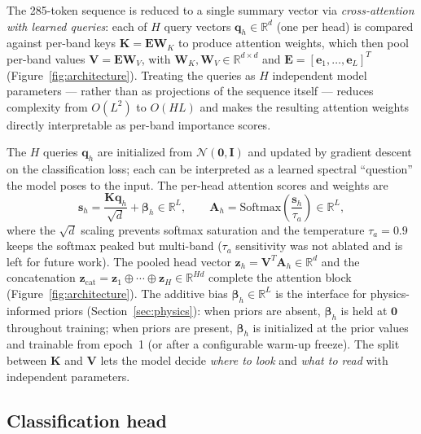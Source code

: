 \documentclass[preprint,12pt]{elsarticle}
\newcommand{\R}{\mathbb{R}}
\begin{document}
The 285-token sequence is reduced to a single summary vector via \emph{cross-attention with learned queries}: each of $H$ query vectors $\mathbf{q}_h \in \R^d$ (one per head) is compared against per-band keys $\mathbf{K} = \mathbf{E}\mathbf{W}_K$ to produce attention weights, which then pool per-band values $\mathbf{V} = \mathbf{E}\mathbf{W}_V$, with $\mathbf{W}_K, \mathbf{W}_V \in \R^{d \times d}$ and $\mathbf{E} = [\mathbf{e}_1,\ldots,\mathbf{e}_L]^T$ (Figure~\ref{fig:architecture}). Treating the queries as $H$ independent model parameters --- rather than as projections of the sequence itself --- reduces complexity from $O(L^2)$ to $O(H L)$ and makes the resulting attention weights directly interpretable as per-band importance scores.

The $H$ queries $\mathbf{q}_h$ are initialized from $\mathcal{N}(\mathbf{0}, \mathbf{I})$ and updated by gradient descent on the classification loss; each can be interpreted as a learned spectral ``question'' the model poses to the input. The per-head attention scores and weights are
\begin{equation}
\mathbf{s}_h = \frac{\mathbf{K}\mathbf{q}_h}{\sqrt{d}} + \bm{\beta}_h \in \R^L, \qquad \mathbf{A}_h = \text{Softmax}\!\left(\frac{\mathbf{s}_h}{\tau_a}\right) \in \R^L,
\label{eq:attn_score}
\end{equation}
where the $\sqrt{d}$ scaling prevents softmax saturation and the temperature $\tau_a = 0.9$ keeps the softmax peaked but multi-band ($\tau_a$ sensitivity was not ablated and is left for future work). The pooled head vector $\mathbf{z}_h = \mathbf{V}^T \mathbf{A}_h \in \R^d$ and the concatenation $\mathbf{z}_{\text{cat}} = \mathbf{z}_1 \oplus \cdots \oplus \mathbf{z}_H \in \R^{Hd}$ complete the attention block (Figure~\ref{fig:architecture}). The additive bias $\bm{\beta}_h \in \R^L$ is the interface for physics-informed priors (Section~\ref{sec:physics}): when priors are absent, $\bm{\beta}_h$ is held at $\mathbf{0}$ throughout training; when priors are present, $\bm{\beta}_h$ is initialized at the prior values and trainable from epoch~1 (or after a configurable warm-up freeze). The split between $\mathbf{K}$ and $\mathbf{V}$ lets the model decide \emph{where to look} and \emph{what to read} with independent parameters.

\subsection{Classification head}
\label{sec:classification}
\end{document}
